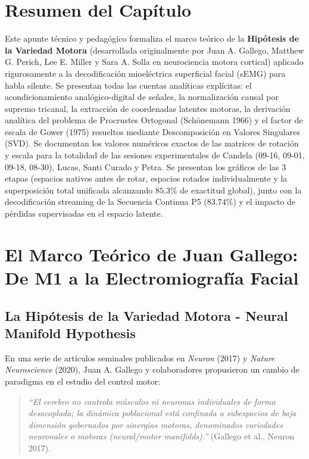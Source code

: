 \documentclass[11pt,a4paper,openany]{book}
\theoremstyle{definition}
\begin{document}
\section*{Resumen del Capítulo}
Este apunte técnico y pedagógico formaliza el marco teórico de la \textbf{Hipótesis de la Variedad Motora} (desarrollada originalmente por Juan A. Gallego, Matthew G. Perich, Lee E. Miller y Sara A. Solla en neurociencia motora cortical) aplicado rigurosamente a la decodificación mioeléctrica superficial facial (sEMG) para habla silente. Se presentan todas las cuentas analíticas explícitas: el acondicionamiento analógico-digital de señales, la normalización causal por supremo tricanal, la extracción de coordenadas latentes motoras, la derivación analítica del problema de Procrustes Ortogonal (Schönemann 1966) y el factor de escala de Gower (1975) resueltos mediante Descomposición en Valores Singulares (SVD). Se documentan los valores numéricos exactos de las matrices de rotación y escala para la totalidad de las sesiones experimentales de Candela (09-16, 09-01, 09-18, 08-30), Lucas, Santi Curado y Petra. Se presentan los gráficos de las 3 etapas (espacios nativos antes de rotar, espacios rotados individualmente y la superposición total unificada alcanzando $85.3\%$ de exactitud global), junto con la decodificación streaming de la Secuencia Continua P5 ($83.74\%$) y el impacto de pérdidas supervisadas en el espacio latente.



\newpage

\section{El Marco Teórico de Juan Gallego: De M1 a la Electromiografía Facial}
\label{sec:marco_gallego}

\subsection{La Hipótesis de la Variedad Motora - Neural Manifold Hypothesis}
En una serie de artículos seminales publicados en \textit{Neuron} (2017) y \textit{Nature Neuroscience} (2020), Juan A. Gallego y colaboradores propusieron un cambio de paradigma en el estudio del control motor:

\begin{quote}
\textit{``El cerebro no controla músculos ni neuronas individuales de forma desacoplada; la dinámica poblacional está confinada a subespacios de baja dimensión gobernados por sinergias motoras, denominados variedades neuronales o motoras (neural/motor manifolds).''} (Gallego et al., Neuron 2017).
\end{quote}
\end{document}
